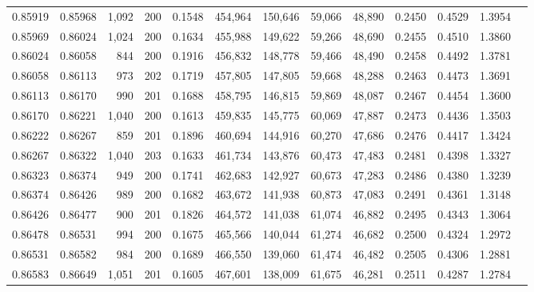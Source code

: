 \begin{tabular}{rrrrrrrrrrrrr}
0.85919 & 0.85968 & 1,092 & 200 &                                     0.1548 & 454,964 & 150,646 &  59,066 &  48,890 & 0.2450 & 0.4529 & 1.3954 \\
0.85969 & 0.86024 & 1,024 & 200 &                                     0.1634 & 455,988 & 149,622 &  59,266 &  48,690 & 0.2455 & 0.4510 & 1.3860 \\
0.86024 & 0.86058 &   844 & 200 &                                     0.1916 & 456,832 & 148,778 &  59,466 &  48,490 & 0.2458 & 0.4492 & 1.3781 \\
0.86058 & 0.86113 &   973 & 202 &                                     0.1719 & 457,805 & 147,805 &  59,668 &  48,288 & 0.2463 & 0.4473 & 1.3691 \\
0.86113 & 0.86170 &   990 & 201 &                                     0.1688 & 458,795 & 146,815 &  59,869 &  48,087 & 0.2467 & 0.4454 & 1.3600 \\
0.86170 & 0.86221 & 1,040 & 200 &                                     0.1613 & 459,835 & 145,775 &  60,069 &  47,887 & 0.2473 & 0.4436 & 1.3503 \\
0.86222 & 0.86267 &   859 & 201 &                                     0.1896 & 460,694 & 144,916 &  60,270 &  47,686 & 0.2476 & 0.4417 & 1.3424 \\
0.86267 & 0.86322 & 1,040 & 203 &                                     0.1633 & 461,734 & 143,876 &  60,473 &  47,483 & 0.2481 & 0.4398 & 1.3327 \\
0.86323 & 0.86374 &   949 & 200 &                                     0.1741 & 462,683 & 142,927 &  60,673 &  47,283 & 0.2486 & 0.4380 & 1.3239 \\
0.86374 & 0.86426 &   989 & 200 &                                     0.1682 & 463,672 & 141,938 &  60,873 &  47,083 & 0.2491 & 0.4361 & 1.3148 \\
0.86426 & 0.86477 &   900 & 201 &                                     0.1826 & 464,572 & 141,038 &  61,074 &  46,882 & 0.2495 & 0.4343 & 1.3064 \\
0.86478 & 0.86531 &   994 & 200 &                                     0.1675 & 465,566 & 140,044 &  61,274 &  46,682 & 0.2500 & 0.4324 & 1.2972 \\
0.86531 & 0.86582 &   984 & 200 &                                     0.1689 & 466,550 & 139,060 &  61,474 &  46,482 & 0.2505 & 0.4306 & 1.2881 \\
0.86583 & 0.86649 & 1,051 & 201 &                                     0.1605 & 467,601 & 138,009 &  61,675 &  46,281 & 0.2511 & 0.4287 & 1.2784 \\

\end{tabular}
